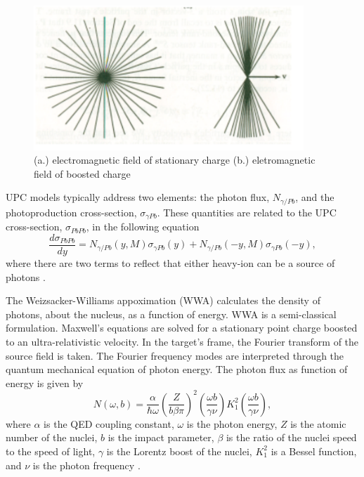 \begin{figure}[h!]
\begin{centering}
\includegraphics[width=4in]{Chapter1/importfigs/jackson_em_wwa.png}
\par\end{centering}
\caption{ (a.) electromagnetic field of stationary charge (b.) eletromagnetic field of boosted charge \cite{WWJackson} \label{fig:smushedField}}
\end{figure}

UPC models typically address two elements: the photon flux, $N_{\gamma / Pb}$, and the photoproduction cross-section, $\sigma_{\gamma Pb}$. These quantities are related to the UPC cross-section, $\sigma_{PbPb}$, in the following equation
\begin{equation}
\frac{d \sigma_{PbPb}}{dy} = N_{\gamma/Pb}(y,M)\sigma_{\gamma Pb}(y)+N_{\gamma/Pb}(-y,M)\sigma_{\gamma Pb}(-y),
\end{equation}
where there are two terms to reflect that either heavy-ion can be a source of photons \cite{Bertulani:2005ru}. 

The Weizsacker-Williams appoximation (WWA) calculates the density of photons, about the nucleus, as a function of energy. WWA is a semi-classical formulation. Maxwell's equations are solved for a stationary point charge boosted to an ultra-relativistic velocity. In the target's frame, the Fourier transform of the source field is taken. The Fourier frequency modes are interpreted through the quantum mechanical equation of photon energy. The photon flux as function of energy is given by
\begin{equation}
N(\omega,b) = \frac{\alpha}{\hbar \omega}\left( \frac{Z}{b\beta\pi} \right)^2\left ( \frac{\omega b}{\gamma \nu} \right )K_1^2\left ( \frac{\omega b}{\gamma \nu} \right ) ,
\end{equation}
where $\alpha$ is the QED coupling constant, $\omega$ is the photon energy, $Z$ is the atomic number of the nuclei, $b$ is the impact parameter, $\beta$ is the ratio of the nuclei speed to the speed of light, $\gamma$ is the Lorentz boost of the nuclei, $K_1^2$ is a Bessel function, and $\nu$ is the photon frequency \cite{WWJackson}.


